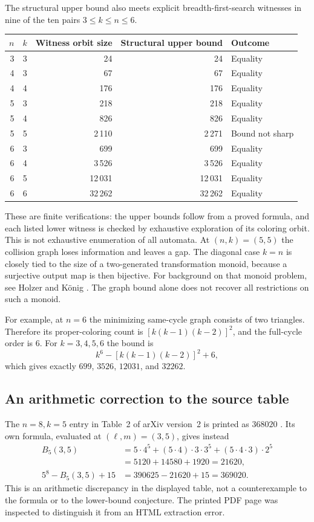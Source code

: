 \documentclass[11pt,a4paper]{article}
\numberwithin{equation}{section}
\theoremstyle{definition}
\theoremstyle{remark}
\begin{document}
The structural upper bound also meets explicit breadth-first-search
witnesses in nine of the ten pairs $3\le k\le n\le6$.
\begin{center}
\begin{tabular}{@{}rrrrl@{}}
\toprule
$n$ & $k$ & Witness orbit size & Structural upper bound & Outcome\\
\midrule
3 & 3 & 24 & 24 & Equality\\
4 & 3 & 67 & 67 & Equality\\
4 & 4 & 176 & 176 & Equality\\
5 & 3 & 218 & 218 & Equality\\
5 & 4 & 826 & 826 & Equality\\
5 & 5 & 2\,110 & 2\,271 & Bound not sharp\\
6 & 3 & 699 & 699 & Equality\\
6 & 4 & 3\,526 & 3\,526 & Equality\\
6 & 5 & 12\,031 & 12\,031 & Equality\\
6 & 6 & 32\,262 & 32\,262 & Equality\\
\bottomrule
\end{tabular}
\end{center}

These are finite verifications: the upper bounds follow from a proved
formula, and each listed lower witness is checked by exhaustive exploration
of its coloring orbit. This is not exhaustive enumeration of all automata.
At $(n,k)=(5,5)$ the collision graph loses information and leaves a gap.
The diagonal case $k=n$ is closely tied to the size of a two-generated
transformation monoid, because a surjective output map is then bijective.
For background on that monoid problem, see Holzer and K\"onig
\cite{HolzerKoenig2004}.
The graph bound alone does not recover all restrictions on such a monoid.

For example, at $n=6$ the minimizing same-cycle graph consists of two
triangles. Therefore its proper-coloring count is
$[k(k-1)(k-2)]^2$, and the full-cycle order is $6$. For $k=3,4,5,6$ the bound
is
\[
 k^6-[k(k-1)(k-2)]^2+6,
\]
which gives exactly $699$, $3526$, $12031$, and $32262$.

\subsection{An arithmetic correction to the source table}\label{sec:correction}

The $n=8,k=5$ entry in Table~2 of arXiv version~2 is printed as $368020$
\cite[p.~13]{Davies2017}. Its own formula, evaluated at $(\ell,m)=(3,5)$,
gives instead
\begin{align*}
 B_5(3,5)
 &=5\cdot4^5+(5\cdot4)\cdot3\cdot3^5
    +(5\cdot4\cdot3)\cdot2^5\\
 &=5120+14580+1920=21620,\\
 5^8-B_5(3,5)+15&=390625-21620+15=369020.
\end{align*}
This is an arithmetic discrepancy in the displayed table, not a
counterexample to the formula or to the lower-bound conjecture. The printed
PDF page was inspected to distinguish it from an HTML extraction error.
\end{document}
